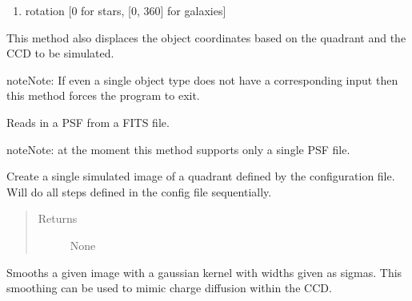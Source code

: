 \documentclass[a4paper,11pt,english]{sphinxmanual}
\begin{document}
\begin{fulllineitems}
\begin{fulllineitems}
\begin{enumerate}
\item {} 
rotation {[}0 for stars, {[}0, 360{]} for galaxies{]}

\end{enumerate}

This method also displaces the object coordinates based on the quadrant and the
CCD to be simulated.

\begin{notice}{note}{Note:}
If even a single object type does not have a corresponding input then this method
forces the program to exit.
\end{notice}

\end{fulllineitems}


\begin{fulllineitems}
\label{simulator:simulator.simulator.VISsimulator.readPSFs}
Reads in a PSF from a FITS file.

\begin{notice}{note}{Note:}
at the moment this method supports only a single PSF file.
\end{notice}

\end{fulllineitems}


\begin{fulllineitems}
\label{simulator:simulator.simulator.VISsimulator.simulate}
Create a single simulated image of a quadrant defined by the configuration file.
Will do all steps defined in the config file sequentially.
\begin{quote}\begin{description}
\item[{Returns}] \leavevmode
None

\end{description}\end{quote}

\end{fulllineitems}


\begin{fulllineitems}
\label{simulator:simulator.simulator.VISsimulator.smoothingWithChargeDiffusion}
Smooths a given image with a gaussian kernel with widths given as sigmas.
This smoothing can be used to mimic charge diffusion within the CCD.


\end{fulllineitems}
\end{fulllineitems}
\end{document}
